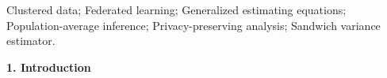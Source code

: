 \documentclass[useAMS,referee, usegraphicx]{biom}
\newcounter{soumikcount}
\newcommand{\soumik}[1]{%
    \stepcounter{soumikcount}%
    \textcolor{teal}{(\texttt{#1})}%
    \addcontentsline{smk}{soumikitem}{\protect\numberline{\thesoumikcount.}#1}%
}
\begin{document}
\begin{abstract}
The successful application of Fed-GEE to a national VHA cohort confirms its effectiveness in characterizing complex AUD prescribing patterns and testifies to the feasibility of generalizing this algorithm to future privacy-preserving research using VHA data.
\vspace{1cm}
\end{abstract}




\begin{keywords} Clustered data; Federated learning; Generalized estimating equations; Population-average inference; Privacy-preserving analysis; Sandwich variance estimator.
\end{keywords}



\maketitle




\textbf{1. Introduction}
\label{sec:intro}
\end{document}
